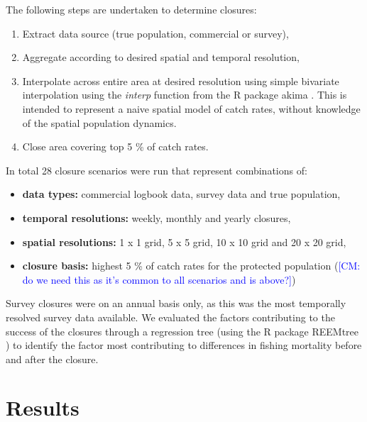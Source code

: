 \documentclass[review]{elsarticle}
\begin{document}
The following steps are undertaken to determine closures:

\begin{enumerate}
	\item Extract data source (true population, commercial or survey), 
	\item Aggregate according to desired spatial and temporal resolution,
	\item Interpolate across entire area at desired resolution using simple
		bivariate interpolation using the \emph{interp} function from
		the R package akima \citep{Akima2006}. This is intended to
		represent a naive spatial model of catch rates, without
		knowledge of the spatial population dynamics.
	\item Close area covering top 5 \% of catch rates.
\end{enumerate}
In total 28 closure scenarios were run that represent combinations of:

\begin{itemize}
	\item \textbf{data types:} commercial logbook data, survey data and
		true population,
	\item \textbf{temporal resolutions:} weekly, monthly and yearly
		closures,
	\item \textbf{spatial resolutions:} 1 x 1 grid, 5 x 5 grid, 10 x 10
		grid and 20 x 20 grid,
	\item \textbf{closure basis:} highest 5 \%  of catch rates for the
		protected population (\textcolor{blue}{[CM: do we need this as it's common to all scenarios and is above?]})
\end{itemize}

 Survey closures were on an
annual basis only, as this was the most temporally resolved survey data
available. We evaluated the factors contributing to the success of the closures
through a regression tree (using the R package REEMtree \citep{Sela2012}) to
identify the factor most contributing to differences in fishing mortality
before and after the closure.

\section{Results}
\end{document}
